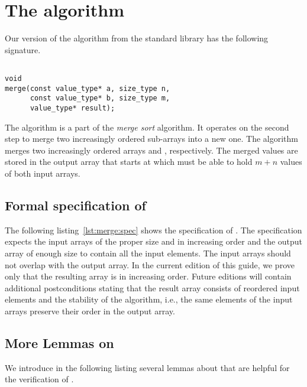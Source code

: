 
\section{The \merge algorithm}
\label{sec:merge}

Our version of the \merge algorithm from the \cxx standard library\cite[28.7.5]{cxx-17-draft}
has the following signature.

\begin{lstlisting}[style = acsl-block]

void
merge(const value_type* a, size_type n,
      const value_type* b, size_type m,
      value_type* result);
\end{lstlisting}

The \merge algorithm is a part of the \emph{merge sort} algorithm.
It operates on the second step to merge two increasingly ordered sub-arrays into a new one.
The algorithm merges two increasingly ordered arrays
 and , respectively.
The merged values are stored in the output array that starts at
 which must be able to hold $m+n$ values of both input arrays.


\subsection{Formal specification of \merge}

The following listing~\ref{lst:merge:spec} shows the specification of \merge.
The specification expects the input arrays of the proper size and in increasing order
and the output array of enough size to contain all the input elements.
The input arrays should not overlap with the output array.
%
In the current edition of this guide, we prove only that the
resulting array is in increasing order.
Future editions will contain additional postconditions stating that the
result array consists of reordered input elements and the stability of the algorithm,
i.e., the same elements of the input arrays preserve their order in the output array.




\subsection{More Lemmas on \WeaklyIncreasing}
\label{sec:WeaklyIncreasingLemmas}

We introduce in the following listing several lemmas about 
that are helpful for the verification of \merge.

